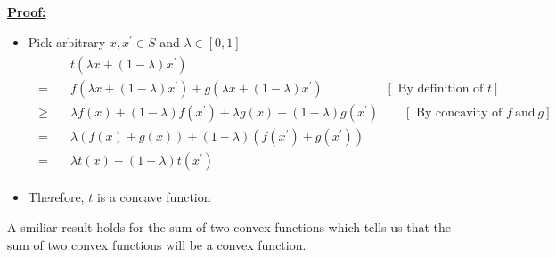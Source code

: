 \documentclass[12pt,a4paper]{article}
\begin{document}
 \underline{\textbf{Proof:}} 
 \begin{itemize}
    \item Pick arbitrary \(x, x^{\prime} \in S\) and \(\lambda \in[0,1]\)
    \begin{align*}
    \begin{array}{ll} 
    & t\left(\lambda x+(1-\lambda) x^{\prime}\right) \\
    =\quad & f\left(\lambda x+(1-\lambda) x^{\prime}\right)+g\left(\lambda x+(1-\lambda) x^{\prime}\right) \qquad \qquad \quad {[\text { By definition of } t]}\\
    \geq \quad & \lambda f(x)+(1-\lambda) f\left(x^{\prime}\right)+\lambda g(x)+(1-\lambda) g\left(x^{\prime}\right) \qquad {[\text { By concavity of } f \ \text{and} \ g]} \\
    = & \lambda(f(x)+g(x))+(1-\lambda)\left(f\left(x^{\prime}\right)+g\left(x^{\prime}\right)\right) \\
    = & \lambda t(x)+(1-\lambda) t\left(x^{\prime}\right)
    \end{array}
   \end{align*}
    
    \item Therefore, \(t\) is a concave function
 \end{itemize}

 A smiliar result holds for the sum of two convex functions which tells us that the sum of two convex functions will be a convex function.

 
\end{document}
